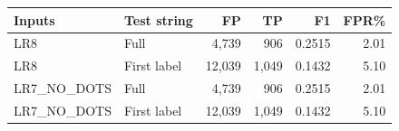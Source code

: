 \centering\footnotesize
\begin{tabular}{@{}llrrrr@{}}
\toprule
Inputs & Test string & FP & TP & F1 & FPR\%\\\midrule
LR8 & Full & 4,739 & 906 & 0.2515 & 2.01\\
LR8 & First label & 12,039 & 1,049 & 0.1432 & 5.10\\
LR7\_NO\_DOTS & Full & 4,739 & 906 & 0.2515 & 2.01\\
LR7\_NO\_DOTS & First label & 12,039 & 1,049 & 0.1432 & 5.10\\
\bottomrule
\end{tabular}
